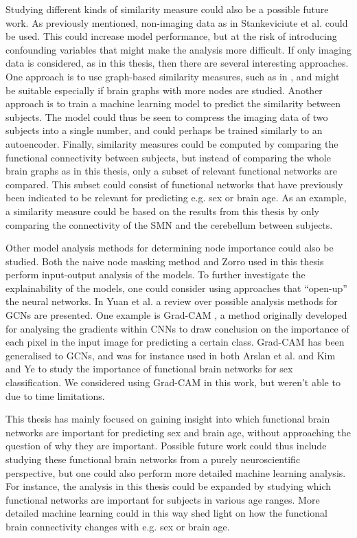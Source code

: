 Studying different kinds of similarity measure could also be a possible future work. As previously mentioned, non-imaging data as in Stankeviciute et al. \cite{stankeviciute} could be used. This could increase model performance, but at the risk of introducing confounding variables that might make the analysis more difficult. If only imaging data is considered, as in this thesis, then there are several interesting approaches. One approach is to use graph-based similarity measures, such as in \cite{higcn}, and might be suitable especially if brain graphs with more nodes are studied. Another approach is to train a machine learning model to predict the similarity between subjects. The model could thus be seen to compress the imaging data of two subjects into a single number, and could perhaps be trained similarly to an autoencoder. Finally, similarity measures could be computed by comparing the functional connectivity between subjects, but instead of comparing the whole brain graphs as in this thesis, only a subset of relevant functional networks are compared. This subset could consist of functional networks that have previously been indicated to be relevant for predicting e.g. sex or brain age. As an example, a similarity measure could be based on the results from this thesis by only comparing the connectivity of the SMN and the cerebellum between subjects.


Other model analysis methods for determining node importance could also be studied. Both the naive node masking method and Zorro used in this thesis perform input-output analysis of the models. To further investigate the explainability of the models, one could consider using approaches that ``open-up'' the neural networks. In Yuan et al. \cite{yuan_survey} a review over possible analysis methods for GCNs are presented. One example is Grad-CAM \cite{gradcam}, a method originally developed for analysing the gradients within CNNs to draw conclusion on the importance of each pixel in the input image for predicting a certain class. Grad-CAM has been generalised to GCNs, and was for instance used in both Arslan et al. \cite{arslan} and Kim and Ye \cite{understanding_gnn} to study the importance of functional brain networks for sex classification. We considered using Grad-CAM in this work, but weren't able to due to time limitations. 

This thesis has mainly focused on gaining insight into which functional brain networks are important for predicting sex and brain age, without approaching the question of why they are important. Possible future work could thus include studying these functional brain networks from a purely neuroscientific perspective, but one could also perform more detailed machine learning analysis. For instance, the analysis in this thesis could be expanded by studying which functional networks are important for subjects in various age ranges. More detailed machine learning could in this way shed light on how the functional brain connectivity changes with e.g. sex or brain age. 


